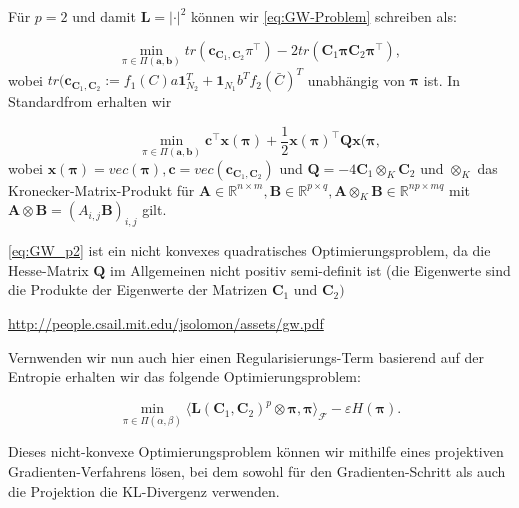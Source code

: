 \documentclass[11pt,a4paper]{article}
\numberwithin{equation}{section}
\begin{document}
	 Für $p=2$ und damit $\boldsymbol{L}=|\cdot|^2$ können wir \autoref{eq:GW-Problem} schreiben als:
	 
	 \begin{equation}
	 	\min_{\pi \in \Pi(\boldsymbol{a}, \boldsymbol{b})}{tr(\boldsymbol{c}_{\boldsymbol{C}_1,  \boldsymbol{C}_2}\pi^\top) - 2 tr(\boldsymbol{C}_1\boldsymbol{\pi}\boldsymbol{C}_2\boldsymbol{\pi}^\top)},
	 \end{equation}
	 	wobei $tr(\boldsymbol{c}_{\boldsymbol{C}_1,  \boldsymbol{C}_2}:= f_1(C)a \boldsymbol{1}_{N_2}^T + \boldsymbol{1}_{N_1}b^Tf_2(\bar{C})^T$ unabhängig von $\boldsymbol{\pi}$ ist.	
	 	In Standardfrom erhalten wir
	 	
	 	\begin{equation}
	 		\min_{\pi \in \Pi(\boldsymbol{a}, \boldsymbol{b})}{\boldsymbol{c}^\top \boldsymbol{x}(\boldsymbol{\pi}) + \frac{1}{2}\boldsymbol{x}(\boldsymbol{\pi})^\top \boldsymbol{Q}\boldsymbol{x}(\boldsymbol{\pi}},	 \label{eq:GW_p2}		
	 	\end{equation}
	 	wobei $\boldsymbol{x}(\boldsymbol{\pi}) = vec(\boldsymbol{\pi}), \boldsymbol{c}= vec(\boldsymbol{c}_{\boldsymbol{C}_1, \boldsymbol{C}_2})$ und $\boldsymbol{Q} = -4 \boldsymbol{C}_1 \otimes_K \boldsymbol{C}_2$ und $\otimes_K$ das Kronecker-Matrix-Produkt für $\boldsymbol{A} \in \mathbb{R}^{n\times m}, \boldsymbol{B} \in \mathbb{R}^{p\times q}, \boldsymbol{A}\otimes_K \boldsymbol{B} \in \mathbb{R}^{np \times mq}$ mit $\boldsymbol{A} \otimes \boldsymbol{B} = (A_{i,j}\boldsymbol{B})_{i,j}$ gilt.
	 	
	 	\autoref{eq:GW_p2} ist ein nicht konvexes quadratisches Optimierungsproblem, da die Hesse-Matrix $\boldsymbol{Q}$ im Allgemeinen nicht positiv semi-definit ist (die Eigenwerte sind die Produkte der Eigenwerte der Matrizen $\boldsymbol{C}_1$ und $\boldsymbol{C}_2)$
	 	
	 	\url{http://people.csail.mit.edu/jsolomon/assets/gw.pdf}
	 	
	 	Vernwenden wir nun auch hier einen Regularisierungs-Term basierend auf der Entropie erhalten wir das folgende Optimierungsproblem:
	 	
	 	\begin{equation}
	 	\min_{\pi \in \Pi (\alpha , \beta)}{\langle \boldsymbol{L}(\boldsymbol{C}_1, \boldsymbol{C}_2)^p \otimes \boldsymbol{\pi}, \boldsymbol{\pi} \rangle_\mathcal{F} - \varepsilon H(\boldsymbol{\pi})}.
	 	\end{equation}
	 	
	 	Dieses nicht-konvexe Optimierungsproblem können wir mithilfe eines projektiven Gradienten-Verfahrens lösen, bei dem sowohl für den Gradienten-Schritt als auch die Projektion die KL-Divergenz verwenden.
	 	
\end{document}
